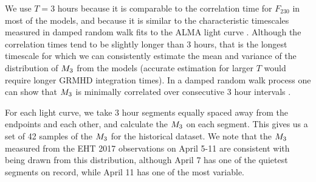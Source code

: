 We use $T = 3$ hours because it is comparable to the correlation time for $F_{230}$ in most of the models, and because it is similar to the characteristic timescales measured in damped random walk fits to the ALMA light curve \citep[see Table 10 of][]{Wielgus2022}.  Although the correlation times tend to be slightly longer than 3 hours, that is the longest timescale for which we can consistently estimate the mean and variance of the distribution of $M_{3}$ from the models (accurate estimation for larger $T$ would require longer GRMHD integration times).  In a damped random walk process one can show that $M_{3}$ is minimally correlated over consecutive 3 hour intervals \citep{Lee_2022}.

For each light curve, we take 3 hour segments equally spaced away from the endpoints and each other, and calculate the $M_{3}$ on each segment. This gives us a set of 42 samples of the $M_{3}$ for the historical dataset. We note that the $M_{3}$ measured from the EHT 2017 observations on April 5-11 are consistent with being drawn from this distribution, although April 7 has one of the quietest segments on record, while April 11 has one of the most variable.



